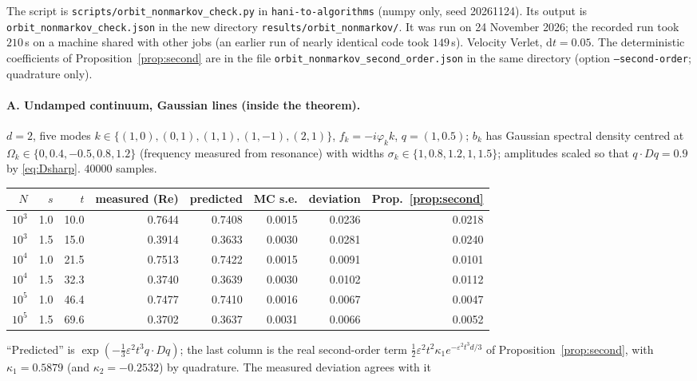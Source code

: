 \documentclass[11pt]{article}
\newcommand{\dd}{\mathrm{d}}
\newcommand{\eps}{\varepsilon}
\theoremstyle{remark}
\begin{document}
{\sloppy The script is \texttt{scripts/orbit\_nonmarkov\_check.py} in
\texttt{hani-to-algorithms} (numpy only, seed 20261124). Its output is
\texttt{orbit\_nonmarkov\_check.json} in the new directory
\texttt{results/orbit\_nonmarkov/}. It was
run on 24 November 2026; the recorded run took $210$\,s on a machine shared
with other jobs (an earlier run of nearly identical code took $149$\,s).
Velocity Verlet, $\dd t = 0.05$. The deterministic coefficients of
Proposition~\ref{prop:second} are in the file
\texttt{orbit\_nonmarkov\_second\_order.json} in the same directory
(option \texttt{--second-order}; quadrature only).\par}

\paragraph{A. Undamped continuum, Gaussian lines (inside the theorem).}
$d=2$, five modes $k\in\{(1,0),(0,1),(1,1),(1,-1),(2,1)\}$,
$f_k = -i\varphi_kk$, $q = (1,0.5)$; $b_k$ has Gaussian spectral density
centred at $\Omega_k\in\{0,0.4,-0.5,0.8,1.2\}$ (frequency measured from
resonance) with widths $\sigma_k\in\{1,0.8,1.2,1,1.5\}$; amplitudes scaled so
that $q\cdot Dq = 0.9$ by \eqref{eq:Dsharp}. $40000$ samples.
\begin{center}
\begin{tabular}{rrrrrrrr}
  $N$ & $s$ & $t$ & measured (Re) & predicted & MC s.e. & deviation &
  Prop.~\ref{prop:second} \\ \hline
  $10^3$ & 1.0 & 10.0 & 0.7644 & 0.7408 & 0.0015 & 0.0236 & 0.0218 \\
  $10^3$ & 1.5 & 15.0 & 0.3914 & 0.3633 & 0.0030 & 0.0281 & 0.0240 \\
  $10^4$ & 1.0 & 21.5 & 0.7513 & 0.7422 & 0.0015 & 0.0091 & 0.0101 \\
  $10^4$ & 1.5 & 32.3 & 0.3740 & 0.3639 & 0.0030 & 0.0102 & 0.0112 \\
  $10^5$ & 1.0 & 46.4 & 0.7477 & 0.7410 & 0.0016 & 0.0067 & 0.0047 \\
  $10^5$ & 1.5 & 69.6 & 0.3702 & 0.3637 & 0.0031 & 0.0066 & 0.0052 \\
\end{tabular}
\end{center}
``Predicted'' is $\exp(-\frac13\eps^2t^3q\cdot Dq)$; the last column is the
real second-order term
$\frac12\eps^2t^2\kappa_1e^{-\eps^2t^3d/3}$ of
Proposition~\ref{prop:second}, with $\kappa_1 = 0.5879$ (and
$\kappa_2 = -0.2532$) by quadrature. The measured deviation agrees with it
\end{document}
